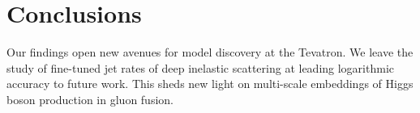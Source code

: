 \section{Conclusions}\label{sec:conclusions}

Our findings open new avenues for model discovery at the Tevatron. We
leave the study of fine-tuned jet rates of deep inelastic scattering at
leading logarithmic accuracy to future work. This sheds new light on
multi-scale embeddings of Higgs boson production in gluon fusion.

